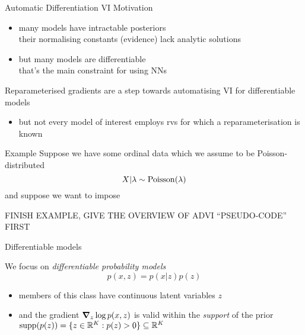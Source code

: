 \documentclass[14pt,dvipsnames]{beamer}
\begin{document}
\begin{frame}{Automatic Differentiation VI}
	Motivation
	\begin{itemize}
		\item many models have intractable posteriors\\
		their normalising constants (evidence) lack analytic solutions \pause
		\item but many models are differentiable\\
		that's the main constraint for using NNs \pause
	\end{itemize}

	Reparameterised gradients are a step towards automatising VI for differentiable models \pause
	\begin{itemize}
		\item but not every model of interest employs rvs for which a reparameterisation is known %
	\end{itemize}
	
\end{frame}

\begin{frame}{Example}
	Suppose we have some ordinal data which we assume to be Poisson-distributed
	\begin{equation*}
		X|\lambda \sim \operatorname{Poisson}(\lambda)
	\end{equation*}
	and suppose we want to impose 
	
	\alert{FINISH EXAMPLE, GIVE THE OVERVIEW OF ADVI ``PSEUDO-CODE'' FIRST}
\end{frame}

\begin{frame}{Differentiable models}

	We focus on \emph{differentiable probability models}
	\begin{equation*}
		p(x,z) = p(x|z)p(z)
	\end{equation*}
	\pause
	\begin{itemize}
		\item members of this class have continuous latent variables $z$\\ \pause
		\item and the gradient $\grad_z \log p(x,z)$ is valid within the \emph{support} of the prior 
		$\operatorname{supp}(p(z)) = \{ z \in \mathbb R^K : p(z) > 0 \} \subseteq \mathbb R^K$
	\end{itemize}
	
\end{frame}
\end{document}
